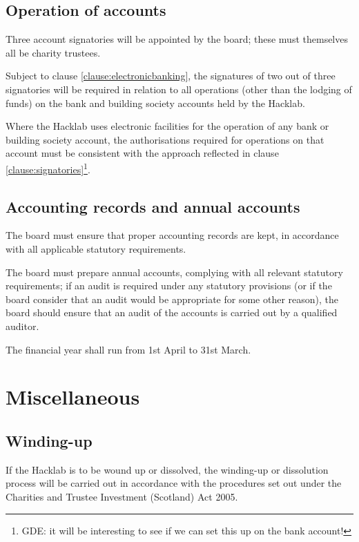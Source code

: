 \documentclass{article}
\newcommand{\charityact}{Charities and Trustee Investment (Scotland) Act 2005}
\begin{document}
\subsection{Operation of accounts}

\clause Three account signatories will be appointed by the board;
these must themselves all be charity trustees.

\clause\label{clause:signatories}Subject to clause
\ref{clause:electronicbanking}, the signatures of two out of three
signatories will be required in relation to all
operations (other than the lodging of funds) on the bank and building
society accounts held by the Hacklab.

\clause\label{clause:electronicbanking}Where the Hacklab uses
electronic facilities for the operation of any bank or building
society account, the authorisations required for operations on that
account must be consistent with the approach reflected in clause
\ref{clause:signatories}\footnote{GDE: it will be interesting to see
  if we can set this up on the bank account!}.

\subsection{Accounting records and annual accounts}

\clause The board must ensure that proper accounting records are kept,
in accordance with all applicable statutory requirements.

\clause The board must prepare annual accounts, complying with all
relevant statutory requirements; if an audit is required under any
statutory provisions (or if the board consider that an audit would be
appropriate for some other reason), the board should ensure that an
audit of the accounts is carried out by a qualified auditor.

\clause The financial year shall run from 1st April to 31st March.

\section{Miscellaneous}

\subsection{Winding-up}

\clause  If the Hacklab is to be wound up or dissolved, the winding-up
or dissolution process will be carried out in accordance with the
procedures set out under the \charityact.
\end{document}
